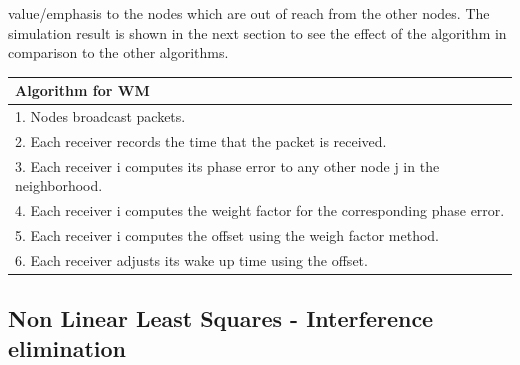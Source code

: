 \documentclass[a4paper,10pt]{report}
\begin{document}
value/emphasis to the nodes which are out of reach from the other nodes. The simulation result is shown in the next section to see the
effect of the algorithm in comparison to the other algorithms.\newline \newline
\begin{tabular}{  l }Algorithm for WM \\\hline
1. Nodes broadcast packets. \\  2. Each receiver records the time that the packet is received. \\
3. Each receiver i computes its phase error to any other node j in the neighborhood. \\
4. Each receiver i computes the weight factor for the corresponding phase error. \\
5. Each receiver i computes the offset using the weigh factor method. \\
6. Each receiver adjusts its wake up time using the offset.\\
\hline
\end{tabular}
\subsection{\textbf{Non Linear Least Squares - Interference elimination}}
\end{document}
